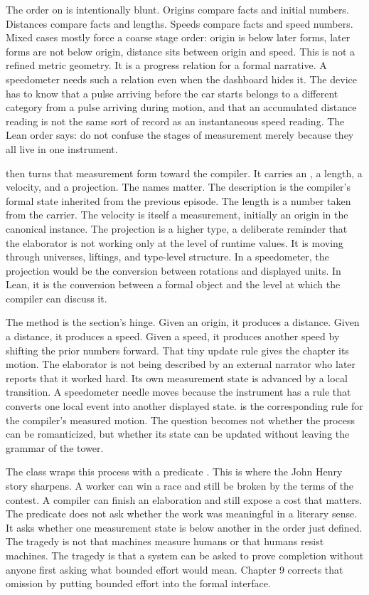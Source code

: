 The order on  is intentionally blunt. Origins compare facts
and initial numbers. Distances compare facts and lengths. Speeds compare facts
and speed numbers. Mixed cases mostly force a coarse stage order: origin is
below later forms, later forms are not below origin, distance sits between
origin and speed. This is not a refined metric geometry. It is a progress
relation for a formal narrative. A speedometer needs such a relation even when
the dashboard hides it. The device has to know that a pulse arriving before the
car starts belongs to a different category from a pulse arriving during
motion, and that an accumulated distance reading is not the same sort of
record as an instantaneous speed reading. The Lean order says: do not confuse
the stages of measurement merely because they all live in one instrument.

 then turns that measurement form toward the compiler. It
carries an , a length, a velocity, and a projection.
The names matter. The description is the compiler's formal state inherited
from the previous episode. The length is a number taken from the carrier. The
velocity is itself a measurement, initially an origin in the canonical
instance. The projection is a higher type, a deliberate reminder that the
elaborator is not working only at the level of runtime values. It is moving
through universes, liftings, and type-level structure. In a speedometer, the
projection would be the conversion between rotations and displayed units. In
Lean, it is the conversion between a formal object and the level at which the
compiler can discuss it.

The method  is the section's hinge. Given an origin, it produces
a distance. Given a distance, it produces a speed. Given a speed, it produces
another speed by shifting the prior numbers forward. That tiny update rule
gives the chapter its motion. The elaborator is not being described by an
external narrator who later reports that it worked hard. Its own measurement
state is advanced by a local transition. A speedometer needle moves because
the instrument has a rule that converts one local event into another displayed
state.  is the corresponding rule for the compiler's measured
motion. The question becomes not whether the process can be romanticized, but
whether its state can be updated without leaving the grammar of the tower.

The class  wraps this process with a predicate
. This is where the John Henry story sharpens. A worker can win
a race and still be broken by the terms of the contest. A compiler can finish
an elaboration and still expose a cost that matters. The predicate does not
ask whether the work was meaningful in a literary sense. It asks whether one
measurement state is below another in the order just defined. The tragedy is
not that machines measure humans or that humans resist machines. The tragedy
is that a system can be asked to prove completion without anyone first asking
what bounded effort would mean. Chapter 9 corrects that omission by putting
bounded effort into the formal interface.

